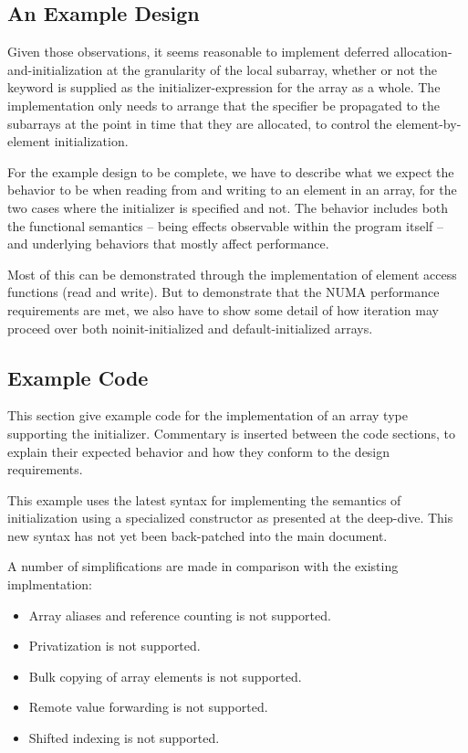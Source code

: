 \subsection{An Example Design}

Given those observations, it seems reasonable to implement deferred
allocation-and-initialization at the granularity of the local subarray, whether or not the
 keyword is supplied as the initializer-expression for the array as a whole.
The implementation only needs to arrange that the  specifier be propagated to
the subarrays at the point in time that they are allocated, to control the
element-by-element initialization.

For the example design to be complete, we have to describe what we expect the behavior to
be when reading from and writing to an element in an array, for the two cases where the
 initializer is specified and not.  The behavior includes both the functional
semantics -- being effects observable within the program itself -- and underlying behaviors
that mostly affect performance.

Most of this can be demonstrated through the implementation of element access functions
(read and write).  But to demonstrate that the NUMA performance requirements are met, we
also have to show some detail of how iteration may proceed over both noinit-initialized
and default-initialized arrays.

\subsection{Example Code}

This section give example code for the implementation of an array type supporting the
 initializer.  Commentary is inserted between the code sections, to explain
their expected behavior and how they conform to the design requirements.

\begin{note}
This example uses the latest syntax for implementing the semantics of 
initialization using a specialized constructor as presented at the deep-dive.  This new
syntax has not yet been back-patched into the main document.
\end{note}

A number of simplifications are made in comparison with the existing implmentation:
\begin{itemize}
\item Array aliases and reference counting is not supported.
\item Privatization is not supported.
\item Bulk copying of array elements is not supported.
\item Remote value forwarding is not supported.
\item Shifted indexing is not supported.
\end{itemize}


